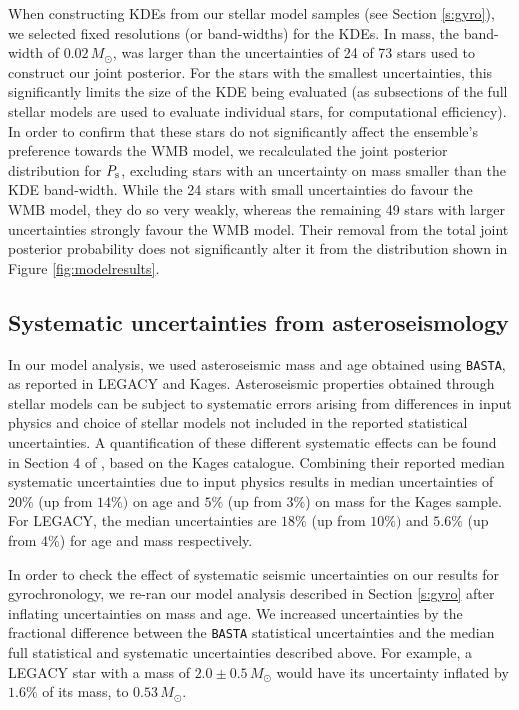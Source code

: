 When constructing KDEs from our stellar model samples (see Section \ref{s:gyro}), we selected fixed resolutions (or band-widths) for the KDEs. In mass, the band-width of $0.02\, M_\odot$, was larger than the uncertainties of 24 of 73 stars used to construct our joint posterior. For the stars with the smallest uncertainties, this significantly limits the size of the KDE being evaluated (as subsections of the full stellar models are used to evaluate individual stars, for computational efficiency). In order to confirm that these stars do not significantly affect the ensemble's preference towards the WMB model, we recalculated the joint posterior distribution for $P_{\rm s}$, excluding stars with an uncertainty on mass smaller than the KDE band-width. While the 24 stars with small uncertainties do favour the WMB model, they do so very weakly, whereas the remaining 49 stars with larger uncertainties strongly favour the WMB model. Their removal from the total joint posterior probability does not significantly alter it from the distribution shown in Figure \ref{fig:modelresults}.

\subsection{Systematic uncertainties from asteroseismology}
In our model analysis, we used asteroseismic mass and age obtained using \texttt{BASTA}, as reported in LEGACY and Kages. Asteroseismic properties obtained through stellar models can be subject to systematic errors arising from differences in input physics and choice of stellar models not included in the reported statistical uncertainties. A quantification of these different systematic effects can be found in Section 4 of \cite{silvaaguirre+2015}, based on the Kages catalogue. Combining their reported median systematic uncertainties due to input physics results in median uncertainties of $20\%$ (up from $14\%)$ on age and $5\%$ (up from $3\%$) on mass for the Kages sample. For LEGACY, the median uncertainties are $18\%$ (up from $10\%)$ and $5.6\%$ (up from $4\%$) for age and mass respectively.

In order to check the effect of systematic seismic uncertainties on our results for gyrochronology, we re-ran our model analysis described in Section \ref{s:gyro} after inflating uncertainties on mass and age. We increased uncertainties by the fractional difference between the \texttt{BASTA} statistical uncertainties and the median full statistical and systematic uncertainties described above. For example, a LEGACY star with a mass of $2.0 \pm 0.5\, M_\odot$ would have its uncertainty inflated by $1.6\%$ of its mass, to $0.53\, M_\odot$.

